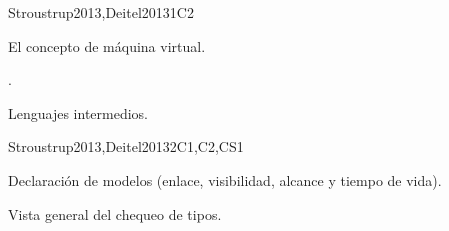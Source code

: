 \begin{syllabus}
\begin{unit}{\OSVirtualMachines}{}{Stroustrup2013,Deitel2013}{1}{C2}
    \begin{topics}
        \item El concepto de máquina virtual.
        \item \OSVirtualMachinesTopicTypes.
        \item Lenguajes intermedios.
    \end{topics}
    \begin{learningoutcomes}
        \item \OSVirtualMachinesLOExplainTheVirtual [\Familiarity]
        \item \OSVirtualMachinesLODifferentiateEmulation [\Familiarity]
        \item \OSVirtualMachinesLOEvaluateVirtualization [\Assessment]
    \end{learningoutcomes}
\end{unit}

\begin{unit}{\PLBasicTypeSystems}{}{Stroustrup2013,Deitel2013}{2}{C1,C2,CS1}
    \begin{topics}
        \item \PLBasicTypeSystemsTopicA        
        \item Declaración de modelos (enlace, visibilidad, alcance y tiempo de vida).
        \item Vista general del chequeo de tipos.
    \end{topics}
    \begin{learningoutcomes}
        \item \PLBasicTypeSystemsLOForBoth [\Familiarity] 
        \item \PLBasicTypeSystemsLOForA [\Familiarity] 
        \item \PLBasicTypeSystemsLODescribeExamples [\Familiarity] 
        \item \PLBasicTypeSystemsLOForMultiple [\Usage] 
        \item \PLBasicTypeSystemsLOGiveAnThat [\Familiarity] 
        \item \PLBasicTypeSystemsLOUseTypes [\Usage] 
        \item \PLBasicTypeSystemsLOExplainHowDefine [\Familiarity] 
        \item \PLBasicTypeSystemsLOWriteDown [\Usage] 
        \item \PLBasicTypeSystemsLOExplainWhyType [\Familiarity] 
        \item \PLBasicTypeSystemsLODefineAndPieces [\Usage] 
        \item \PLBasicTypeSystemsLODiscussTheGenerics [\Familiarity] 
        \item \PLBasicTypeSystemsLOExplainMultiple [\Familiarity] 
    \end{learningoutcomes}
\end{unit}


\end{syllabus}
